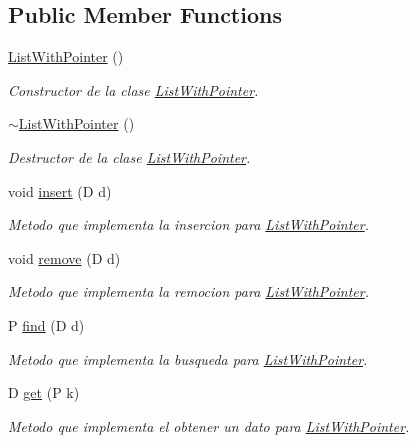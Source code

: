 \subsection*{Public Member Functions}
\begin{DoxyCompactItemize}
\item 
\hyperlink{class_list_with_pointer_a53b1284b13bf834bc5fc1eb27368a283}{List\+With\+Pointer} ()
\begin{DoxyCompactList}\small\item\em Constructor de la clase \hyperlink{class_list_with_pointer}{List\+With\+Pointer}. \end{DoxyCompactList}\item 
\hyperlink{class_list_with_pointer_a2a19c2e6e9bdee1c56750e36d6bbd7c2}{$\sim$\+List\+With\+Pointer} ()
\begin{DoxyCompactList}\small\item\em Destructor de la clase \hyperlink{class_list_with_pointer}{List\+With\+Pointer}. \end{DoxyCompactList}\item 
void \hyperlink{class_list_with_pointer_a676e57683ade8e179e8eff5885f7309a}{insert} (D d)
\begin{DoxyCompactList}\small\item\em Metodo que implementa la insercion para \hyperlink{class_list_with_pointer}{List\+With\+Pointer}. \end{DoxyCompactList}\item 
void \hyperlink{class_list_with_pointer_abcb151e95e9fffea7f9f7af593d8176f}{remove} (D d)
\begin{DoxyCompactList}\small\item\em Metodo que implementa la remocion para \hyperlink{class_list_with_pointer}{List\+With\+Pointer}. \end{DoxyCompactList}\item 
P \hyperlink{class_list_with_pointer_afeff8b963c197378553e2a3f73eaf66a}{find} (D d)
\begin{DoxyCompactList}\small\item\em Metodo que implementa la busqueda para \hyperlink{class_list_with_pointer}{List\+With\+Pointer}. \end{DoxyCompactList}\item 
D \hyperlink{class_list_with_pointer_a0ff36c852334da8bc167356e636c1846}{get} (P k)
\begin{DoxyCompactList}\small\item\em Metodo que implementa el obtener un dato para \hyperlink{class_list_with_pointer}{List\+With\+Pointer}. \end{DoxyCompactList}\item 

\end{DoxyCompactItemize}
